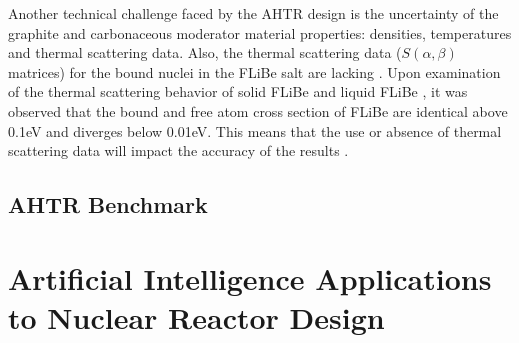 Another technical challenge faced by the \gls{AHTR} design is the uncertainty of 
the graphite and carbonaceous moderator material properties: densities, temperatures
and thermal scattering data.
Also, the thermal scattering data ($S(\alpha,\beta)$ matrices) for the bound 
nuclei in the \gls{FLiBe} salt are lacking \cite{ramey_monte_2018}. 
Upon examination of the thermal scattering behavior of solid \gls{FLiBe}
\cite{mei_investigation_2013} and liquid \gls{FLiBe} \cite{zhu_thermal_2017}, 
it was observed that the bound and free atom cross section of \gls{FLiBe} are 
identical above 0.1eV and diverges below 0.01eV. 
This means that the use or absence of thermal scattering data will impact the 
accuracy of the results \cite{ramey_monte_2018}. 

\subsection{AHTR Benchmark}


\section{Artificial Intelligence Applications to Nuclear Reactor Design}
